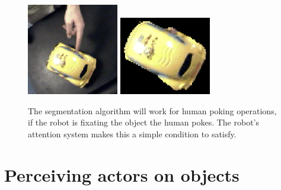 
\begin{figure}[tbh]
  \centerline{
\includegraphics[width=4cm]{fig-car-hand-seg-src}
\hspace{1cm}
\includegraphics[width=4cm]{fig-car-hand-seg}
}
  \caption{
The segmentation algorithm will work for human poking operations, 
if the robot is fixating the object the human pokes.  The robot's 
attention system makes this a simple condition to satisfy.
}
  \label{fig:hand-poke}
\end{figure}


\section{Perceiving act{\bf ors} on objects}

\label{sect:manipulator}

